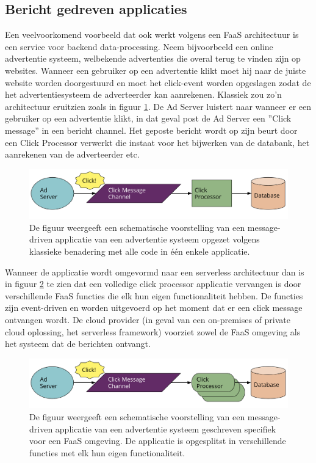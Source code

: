\subsection{Bericht gedreven applicaties}
Een veelvoorkomend voorbeeld dat ook werkt volgens een FaaS architectuur is een service voor backend data-processing. Neem bijvoorbeeld een online advertentie systeem, welbekende advertenties die overal terug te vinden zijn op websites. Wanneer een gebruiker op een advertentie klikt moet hij naar de juiste website worden doorgestuurd en moet het click-event worden opgeslagen zodat de het advertentiesysteem de adverteerder kan aanrekenen.
Klassiek zou zo'n architectuur eruitzien zoals in figuur \ref{fig:klassiek-message-driven}. De Ad Server luistert naar wanneer er een gebruiker op een advertentie klikt, in dat geval post de Ad Server een ''Click message'' in een bericht channel. Het geposte bericht wordt op zijn beurt door een Click Processor verwerkt die instaat voor het bijwerken van de databank, het aanrekenen van de adverteerder etc.
\begin{figure}
    \includegraphics[width=1\textwidth]{img/klassiek_message_driven.png}
    \caption{De figuur weergeeft een schematische voorstelling van een message-driven applicatie van een advertentie systeem opgezet volgens klassieke benadering met alle code in één enkele applicatie. \autocite{Roberts2018}} 
    \label{fig:klassiek-message-driven}  
\end{figure}

Wanneer de applicatie wordt omgevormd naar een serverless architectuur dan is in figuur \ref{fig:faas-message-driven} te zien dat een volledige click processor applicatie vervangen is door verschillende FaaS functies die elk hun eigen functionaliteit hebben. De functies zijn event-driven en worden uitgevoerd op het moment dat er een click message ontvangen wordt. De cloud provider (in geval van een on-premises of private cloud oplossing, het serverless framework)  voorziet zowel de FaaS omgeving als het systeem dat de berichten ontvangt.
\begin{figure}
    \includegraphics[width=1\textwidth]{img/faas_message_driven.png}
    \caption{De figuur weergeeft een schematische voorstelling van een message-driven applicatie van een advertentie systeem geschreven specifiek voor een FaaS omgeving. De applicatie is opgesplitst in verschillende functies met elk hun eigen functionaliteit. \autocite{Roberts2018}} 
    \label{fig:faas-message-driven}  
\end{figure}

